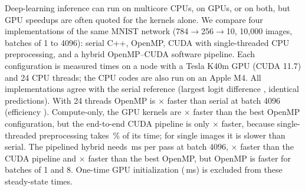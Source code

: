 Deep-learning inference can run on multicore CPUs, on GPUs, or on both, but GPU speedups are often quoted for the kernels alone. We compare four implementations of the same MNIST network (784$\to$256$\to$10, 10{,}000 images, batches of 1 to 4096): serial C++, OpenMP, CUDA with single-threaded CPU preprocessing, and a hybrid OpenMP--CUDA software pipeline. Each configuration is measured  times on a node with a Tesla K40m GPU (CUDA 11.7) and 24 CPU threads; the CPU codes are also run on an Apple M4. All implementations agree with the serial reference (largest logit difference , identical predictions). With 24 threads OpenMP is $\times$ faster than serial at batch 4096 (efficiency ). Compute-only, the GPU kernels are $\times$ faster than the best OpenMP configuration, but the end-to-end CUDA pipeline is only $\times$ faster, because single-threaded preprocessing takes \,\% of its time; for single images it is slower than serial. The pipelined hybrid needs \,ms per pass at batch 4096, $\times$ faster than the CUDA pipeline and $\times$ faster than the best OpenMP, but OpenMP is faster for batches of 1 and 8. One-time GPU initialization (\,ms) is excluded from these steady-state times.
